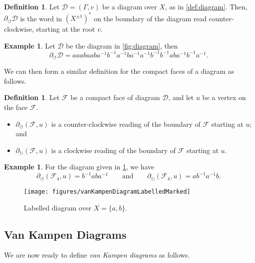 \documentclass[11pt,a4paper,reqno]{amsart}
\theoremstyle{plain}
\theoremstyle{definition}
\newtheorem{definition}[theorem]{Definition}
\theoremstyle{definition}
\newtheorem{example}[theorem]{Example}
\begin{document}
\begin{definition}\label{def:boundary-of-diagram}
	Let $\mathcal D = (\Gamma, v)$ be a diagram over $X$, as in \cref{def:diagram}.
	Then, $\partial_{\circlearrowleft} \mathcal D$ is the word in $(X^{\pm 1})^*$ on the boundary of the diagram read counter-clockwise, starting at the root $v$.
\end{definition}

\begin{example}
	Let $\mathcal D$ be the diagram in \cref{fig:diagram}, then \[\partial_{\circlearrowleft} \mathcal D = aaabaaba^{-1}b^{-1}a^{-1}ba^{-1}a^{-1}b^{-1}b^{-1}aba^{-1}b^{-1}a^{-1}.\]
\end{example}

We can then form a similar definition for the compact faces of a diagram as follows.

\begin{definition}\label{def:boundary-of-face}
	Let $\mathcal F$ be a compact face of diagram $\mathcal D$, and let $u$ be a vertex on the face $\mathcal F$.
	\begin{itemize}[leftmargin=2em]
		\item $\partial_{\circlearrowleft} (\mathcal F,u)$ is a counter-clockwise reading of the boundary of $\mathcal F$ starting at $u$; and
		\item $\partial_{\circlearrowright} (\mathcal F,u)$ is a clockwise reading of the boundary of $\mathcal F$ starting at $u$.
	\end{itemize}
\end{definition}

\begin{example}
	For the diagram given in \cref{fig:diagram-labeled}, we have
	\[
		\partial_{\circlearrowleft} (\mathcal F_4,u) = b^{-1}a b a^{-1}
		\qquad\text{and}\qquad
		\partial_{\circlearrowright} (\mathcal F_4,u) =ab^{-1}a^{-1}b.
	\]
\end{example}

\begin{figure}[ht!]
	\centering
	\texttt{[image: figures/vanKampenDiagramLabelledMarked]}
	\caption{Labelled diagram over $X = \{a,b\}$.}\label{fig:diagram-labeled}
\end{figure}

\subsection{Van Kampen Diagrams}
We are now ready to define \emph{van Kampen diagrams} as follows.
\end{document}
